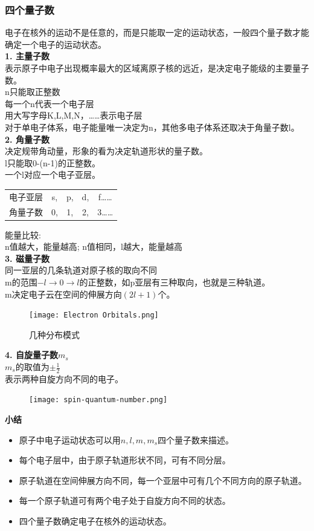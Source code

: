\documentclass[utf8,a4paper,12pt]{ctexart}
\begin{document}
\subsubsection{四个量子数}
电子在核外的运动不是任意的，而是只能取一定的运动状态，一般四个量子数才能确定一个电子的运动状态。\\
{\bf 1. 主量子数}\\
表示原子中电子出现概率最大的区域离原子核的远近，是决定电子能级的主要量子数。\\
n只能取正整数\\
每一个n代表一个电子层\\
用大写字母K,L,M,N，……表示电子层\\
对于单电子体系，电子能量唯一决定为n，其他多电子体系还取决于角量子数l。\\
{\bf 2. 角量子数}\\
决定规带角动量，形象的看为决定轨道形状的量子数。\\
l只能取0-(n-1)的正整数。\\
一个l对应一个电子亚层。
\begin{table}[H]
\centering
\begin{tabular}{ccccc}
电子亚层&s,&p,&d,&f……\\
角量子数&0,&1,&2,&3……

\end{tabular}
\end{table}
能量比较:\\
{\centering
n值越大，能量越高;
n值相同，l越大，能量越高}\\
{\bf 3. 磁量子数}\\
同一亚层的几条轨道对原子核的取向不同\\
m的范围$-l \to 0  \to l$的正整数，如p亚层有三种取向，也就是三种轨道。\\
m决定电子云在空间的伸展方向$(2l+1)$个。\\
\begin{figure}[H]
\centering
\texttt{[image: Electron Orbitals.png]}
\caption{几种分布模式}
\end{figure}
{\bf 4. 自旋量子数$m_s$}\\
$m_s$的取值为$\displaystyle \pm \frac{1}{2}$\\
表示两种自旋方向不同的电子。\\
\begin{figure}[H]
\centering
\texttt{[image: spin-quantum-number.png]}
\end{figure}
{\bf 小结}
\begin{itemize}
\item 原子中电子运动状态可以用$n,l,m,m_s$四个量子数来描述。
\item 每个电子层中，由于原子轨道形状不同，可有不同分层。
\item 原子轨道在空间伸展方向不同，每一个亚层中可有几个不同方向的原子轨道。
\item 每一个原子轨道可有两个电子处于自旋方向不同的状态。
\item 四个量子数确定电子在核外的运动状态。
\end{itemize}
\end{document}
